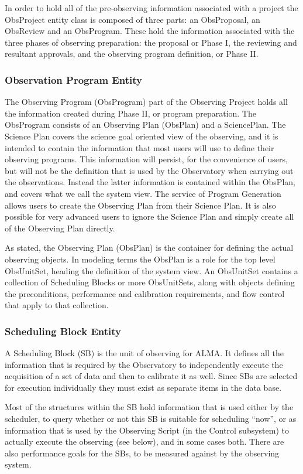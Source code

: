 \documentclass[11pt]{article}
\begin{document}
In order to hold all of the pre-observing information associated with a project the ObsProject entity class is composed of three parts: an ObsProposal, an ObsReview and an ObsProgram. These hold the information associated with the three phases of observing preparation: the proposal or Phase I, the reviewing and resultant approvals, and the observing program definition, or Phase II.

\subsubsection*{Observation Program Entity}
The Observing Program (ObsProgram) part of the Observing Project holds all the information created during Phase II, or program preparation. The ObsProgram consists of an Observing Plan (ObsPlan) and a SciencePlan. The Science Plan covers the science goal oriented view of the observing, and it is intended to contain the information that most users will use to define their observing programs. This information will persist, for the convenience of users, but will not be the definition that is used by the Observatory when carrying out the observations. Instead the latter information is contained within the ObsPlan, and covers what we call the system view. The service of Program Generation allows users to create the Observing Plan from their Science Plan. It is also possible for very advanced users to ignore the Science Plan and simply create all of the Observing Plan directly.

As stated, the Observing Plan (ObsPlan) is the container for defining the actual observing objects. In modeling terms the ObsPlan is a role for the top level ObsUnitSet, heading the definition of the system view. An ObsUnitSet contains a collection of Scheduling Blocks or more ObsUnitSets, along with objects defining the preconditions, performance and calibration requirements, and flow control that apply to that collection.

\subsubsection*{Scheduling Block Entity}
A Scheduling Block (SB) is the unit of observing for ALMA. It defines all the information that is required by the Observatory to independently execute the acquisition of a set of data and then to calibrate it as well. Since SBs are selected for execution individually they must exist as separate items in the data base.

Most of the structures within the SB hold information that is used either by the scheduler, to query whether or not this SB is suitable for scheduling ``now'', or as information that is used by the Observing Script (in the Control subsystem) to actually execute the observing (see below), and in some cases both. There are also performance goals for the SBs, to be measured against by the observing system.
\end{document}
